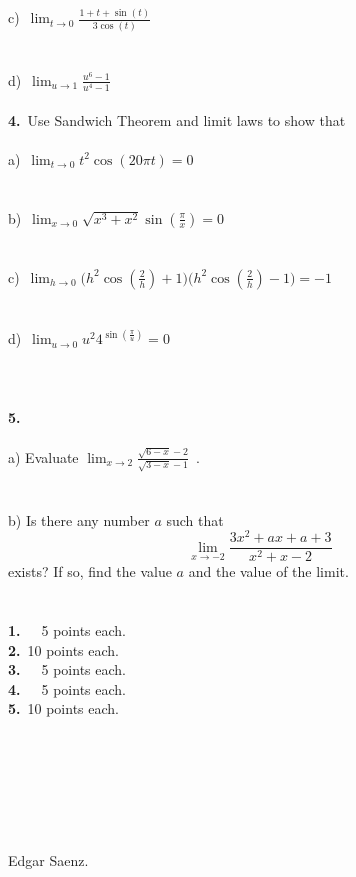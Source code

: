 \documentclass[12pt]{article}
\newcommand{\ds}{\displaystyle}
\newcommand{\Frac}{\displaystyle \frac}
\newcommand{\Sqrt}{\displaystyle \sqrt}
\begin{document}
c)\ $\ds\lim_{t\to 0}\Frac{1+t+\sin(t)}{3\cos(t)}$\\
\\
\\
d)\ $\ds\lim_{u\to 1}\Frac{u^{6}-1}{u^{4}-1}$\\
\newpage\
\\
\textbf{4.}\ Use Sandwich Theorem and limit laws to show that\\
\\
a)\ $\ds\lim_{t\to 0}t^{2}\cos(20\pi t)=0$\\
\\
\\
b)\ $\ds\lim_{x\to 0}\Sqrt{x^{3}+x^{2}}\sin({\frac{\pi}{x}})=0$\\
\\
\\
c)\ $\ds\lim_{h\to 0}\Big(h^{2}\cos(\frac{2}{h})+1\Big)\Big(h^{2}\cos(\frac{2}{h})-1\Big)=-1$\\
\\
\\
d)\ $\ds\lim_{u\to 0}u^{2}4^{\sin(\frac{\pi}{u})}=0$\\
\\
\\
\\
\textbf{5.}\
\\
\\
a) Evaluate $\ds\lim_{x\to 2}\Frac{\sqrt{6-x}-2}{\sqrt{3-x}-1}$\ .
\\
\\
\\
b) Is there any number $a$ such that
$$\ds\lim_{x\to-2}\Frac{3x^{2}+ax+a+3}{x^2+x-2}$$
exists? If so, find the value $a$ and the value of the limit.
\\
\\
\\
\textbf{1.}\ \ \  5 points each.\\
\textbf{2.}\ 10 points each.\\
\textbf{3.}\ \ \ 5 points each.\\
\textbf{4.}\ \ \ 5 points each.\\
\textbf{5.}\ 10 points each.\\
\\\\\\\\\\\\
\begin{flushright}
Edgar Saenz.
\end{flushright}
\newpage
\end{document}
